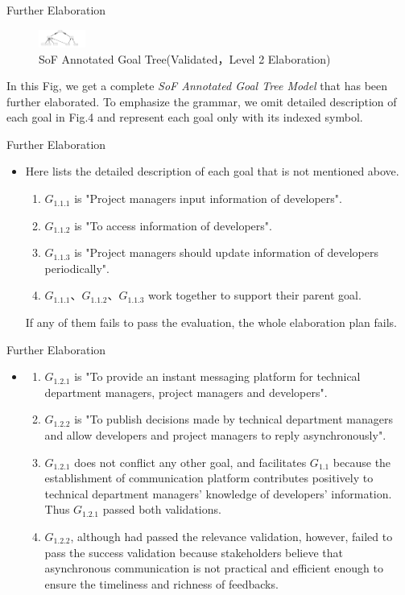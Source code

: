 \documentclass{beamer}
\begin{document}
\begin{frame} {Further Elaboration}
  \begin{figure}
    \includegraphics[width=0.6in]{img/5.PNG}
    \caption{SoF Annotated Goal Tree(Validated，Level 2 Elaboration)}
  \end{figure}
  In this Fig, we get a complete \emph{SoF Annotated Goal Tree Model} that has been further elaborated. To emphasize the grammar,  we omit detailed description of each goal in Fig.4 and represent each goal only with its indexed symbol.
\end{frame}   

\begin{frame}  {Further Elaboration}   %
  \begin{itemize}
  \item
    Here lists the detailed description of each goal that is not mentioned above.
    \begin{enumerate}
    \item $G_{1.1.1}$ is "Project managers input information of developers". 
    \item $G_{1.1.2}$ is "To access information of developers". 
    \item $G_{1.1.3}$ is "Project managers should update information of developers periodically". 
    \item $G_{1.1.1}$、$G_{1.1.2}$、$G_{1.1.3}$ work together to support their parent goal.
    \end{enumerate}
    If any of them fails to pass the evaluation, the whole elaboration plan fails.
  \end{itemize}
\end{frame}

\begin{frame} {Further Elaboration}
  \begin{itemize}
  \item
    \begin{enumerate}
    \item $G_{1.2.1}$ is "To provide an instant messaging platform for technical department managers, project managers and developers".
    \item  $G_{1.2.2}$ is "To publish decisions made by technical department managers and allow developers and project managers to reply asynchronously".
    \item $G_{1.2.1}$ does not conflict any other goal, and facilitates $G_{1.1}$ because the establishment of communication platform contributes positively to technical department managers' knowledge of developers' information. Thus $G_{1.2.1}$ passed both validations.
    \item $G_{1.2.2}$, although had passed the relevance validation, however, failed to pass the success validation because stakeholders believe that asynchronous communication is not practical and efficient enough to ensure the timeliness and richness of feedbacks.      
    \end{enumerate}
  \end{itemize}
\end{frame}
\end{document}
